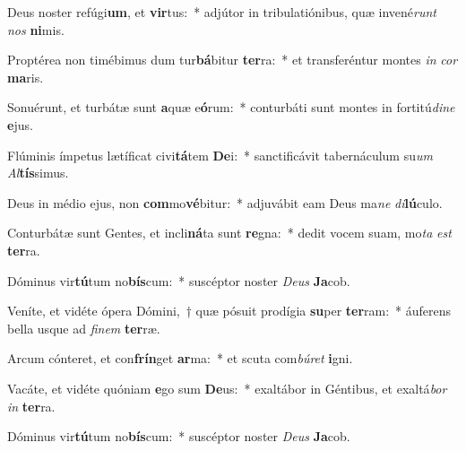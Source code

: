 \item Deus noster refúgi\textbf{um}, et \textbf{vir}tus:~* adjútor in tribulatiónibus, quæ invené\textit{runt} \textit{nos} \textbf{ni}mis.
\item Proptérea non timébimus dum tur\textbf{bá}bitur \textbf{ter}ra:~* et transferéntur montes \textit{in} \textit{cor} \textbf{ma}ris.
\item Sonuérunt, et turbátæ sunt \textbf{a}quæ e\textbf{ó}rum:~* conturbáti sunt montes in fortitú\textit{di}\textit{ne} \textbf{e}jus.
\item Flúminis ímpetus lætíficat civi\textbf{tá}tem \textbf{De}i:~* sanctificávit tabernáculum su\textit{um} \textit{Al}\textbf{tís}simus.
\item Deus in médio ejus, non \textbf{com}mo\textbf{vé}bitur:~* adjuvábit eam Deus ma\textit{ne} \textit{di}\textbf{lú}culo.
\item Conturbátæ sunt Gentes, et incli\textbf{ná}ta sunt \textbf{re}gna:~* dedit vocem suam, mo\textit{ta} \textit{est} \textbf{ter}ra.
\item Dóminus vir\textbf{tú}tum no\textbf{bís}cum:~* suscéptor noster \textit{De}\textit{us} \textbf{Ja}cob.
\item Veníte, et vidéte ópera Dómini,~† quæ pósuit prodígia \textbf{su}per \textbf{ter}ram:~* áuferens bella usque ad \textit{fi}\textit{nem} \textbf{ter}ræ.
\item Arcum cónteret, et con\textbf{frín}get \textbf{ar}ma:~* et scuta com\textit{bú}\textit{ret} \textbf{i}gni.
\item Vacáte, et vidéte quóniam \textbf{e}go sum \textbf{De}us:~* exaltábor in Géntibus, et exaltá\textit{bor} \textit{in} \textbf{ter}ra.
\item Dóminus vir\textbf{tú}tum no\textbf{bís}cum:~* suscéptor noster \textit{De}\textit{us} \textbf{Ja}cob.
